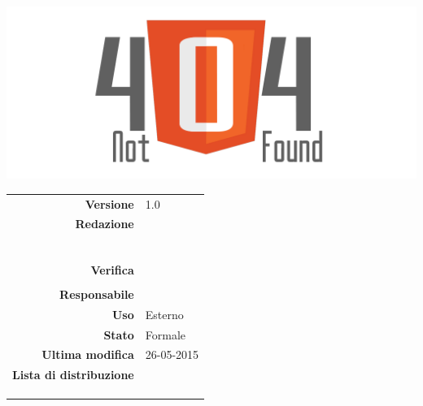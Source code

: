 \thispagestyle{empty}

\begin{titlepage}

	\begin{center}
	\begin{Huge}
		\textbf{\gruppo} \\
	\end{Huge}
	\vspace{0.5cm}
	\begin{Large}
		\textbf{\capitolato}
	\end{Large}
	
	\vspace{1cm}

	\includegraphics[scale=0.35]{../logo/logo404_Extends.png}
	\vspace{1cm}
	\begin{Huge}
		\textbf{\titDoc}
	\end{Huge}
	
	\vspace{1cm}
	
	\begin{table}[h]
	\begin{center}
	\begin{tabular}{r | l}
		\textbf{Versione} & 1.0 \\
		\textbf{Redazione} & \VeFe \\ 
			& \CoMa \\ 
			& \CaMa \\
			& \MaMo \\
			& \ReAn \\
			& \GoIs \\
			& \DeEn \\
		\textbf{Verifica} & \MaMo \\ 
			& \ReAn \\ 
		\textbf{Responsabile} & \GoIs \\
		\textbf{Uso} & Esterno \\
		\textbf{Stato} & Formale \\
		\textbf{Ultima modifica} & 26-05-2015 \\
		\textbf{Lista di distribuzione} & \gruppo \\ 
			& \Vardanega \\
			& \Cardin \\
			& \Zucchetti \\
	\end{tabular}
	\end{center}
	\end{table}
	\end{center}
\end{titlepage}